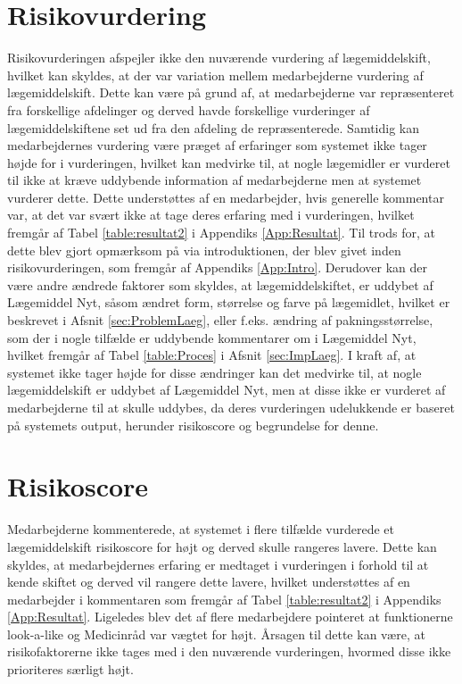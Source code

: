 \section{Risikovurdering}
Risikovurderingen afspejler ikke den nuværende vurdering af lægemiddelskift, hvilket kan skyldes, at der var variation mellem medarbejderne vurdering af lægemiddelskift. Dette kan være på grund af, at medarbejderne var repræsenteret fra forskellige afdelinger og derved havde forskellige vurderinger af lægemiddelskiftene set ud fra den afdeling de repræsenterede. Samtidig kan medarbejdernes vurdering være præget af erfaringer som systemet ikke tager højde for i vurderingen, hvilket kan medvirke til, at nogle lægemidler er vurderet til ikke at kræve uddybende information af medarbejderne men at systemet vurderer dette. Dette understøttes af en medarbejder, hvis generelle  kommentar var, at det var svært ikke at tage deres erfaring med i vurderingen, hvilket fremgår af Tabel \ref{table:resultat2} i Appendiks \ref{App:Resultat}. Til trods for, at dette blev gjort opmærksom på via introduktionen, der blev givet inden risikovurderingen, som fremgår af Appendiks \ref{App:Intro}. Derudover kan der være andre ændrede faktorer som skyldes, at lægemiddelskiftet, er uddybet af Lægemiddel Nyt, såsom ændret form, størrelse og farve på lægemidlet, hvilket er beskrevet i Afsnit \ref{sec:ProblemLaeg}, eller f.eks. ændring af pakningsstørrelse, som der i nogle tilfælde er uddybende kommentarer om i Lægemiddel Nyt, hvilket fremgår af Tabel \ref{table:Proces} i Afsnit \ref{sec:ImpLaeg}. I kraft af, at systemet ikke tager højde for disse ændringer kan det medvirke til, at nogle lægemiddelskift er uddybet af  Lægemiddel Nyt, men at disse ikke er vurderet af medarbejderne til at skulle uddybes, da deres vurderingen udelukkende er baseret på systemets output, herunder risikoscore og begrundelse for denne.

\section{Risikoscore}
Medarbejderne kommenterede, at systemet i flere tilfælde vurderede et lægemiddelskift risikoscore for højt og derved skulle rangeres lavere. Dette kan skyldes, at medarbejdernes erfaring er medtaget i vurderingen i forhold til at kende skiftet og derved vil rangere dette lavere, hvilket understøttes af en medarbejder i kommentaren som fremgår af Tabel \ref{table:resultat2} i Appendiks \ref{App:Resultat}. Ligeledes blev det af flere medarbejdere pointeret at funktionerne look-a-like og Medicinråd var vægtet for højt. Årsagen til dette kan være, at  risikofaktorerne ikke tages med i den nuværende vurderingen, hvormed disse ikke prioriteres særligt højt.

